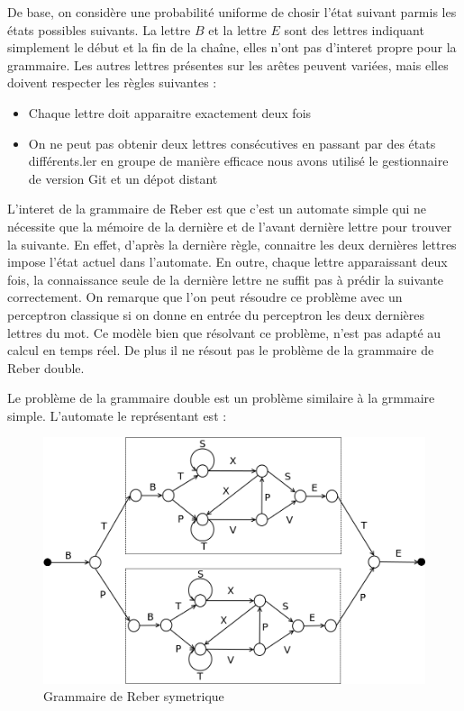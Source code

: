 De base, on considère une probabilité uniforme de chosir l'état suivant parmis
les états possibles suivants. La lettre $B$ et la lettre $E$ sont des lettres
indiquant simplement le début et la fin de la chaîne, elles n'ont pas d'interet
propre pour la grammaire. Les autres lettres présentes sur les arêtes peuvent
variées, mais elles doivent respecter les règles suivantes :
\medskip
\begin{itemize}
	\item Chaque lettre doit apparaitre exactement deux fois
	\item On ne peut pas obtenir deux lettres consécutives en passant par des
états différents.ler en groupe de manière efficace nous avons utilisé le
gestionnaire de version Git et un dépot distant
\end{itemize}
\vspace{\parskip}
L'interet de la grammaire de Reber est que c'est un automate simple qui ne
nécessite que la mémoire de la dernière et de l'avant dernière lettre pour
trouver la suivante. En effet, d'après la dernière règle, connaitre les deux
dernières lettres impose l'état actuel dans l'automate. En outre, chaque lettre
apparaissant deux fois, la connaissance seule de la dernière lettre ne suffit
pas à prédir la suivante correctement. On remarque que l'on peut résoudre ce
problème avec un perceptron classique si on donne en entrée du perceptron les
deux dernières lettres du mot. Ce modèle bien que résolvant ce problème, n'est
pas adapté au calcul en temps réel. De plus il ne résout pas le problème de la
grammaire de Reber double.

Le problème de la grammaire double est un problème similaire à la grmmaire
simple. L'automate le représentant est :

\begin{figure}[!ht]
\begin{center}
\includegraphics[scale=0.4]{images/reberGrammarSymmetric.png}
\end{center}
\caption{Grammaire de Reber symetrique}
\end{figure}

